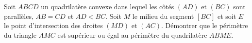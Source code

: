 Soit $ABCD$ un quadrilatère convexe dans lequel les côtés $(AD)$ et $(BC)$ sont parallèles, $AB = CD$ et $AD < BC$. Soit $M$ le milieu du segment $[BC]$ et soit $E$ le point d'intersection des droites $(MD)$ et $(AC)$. Démontrer que le périmètre du triangle $AMC$ est supérieur ou égal au périmètre du quadrilatère $ABME$.